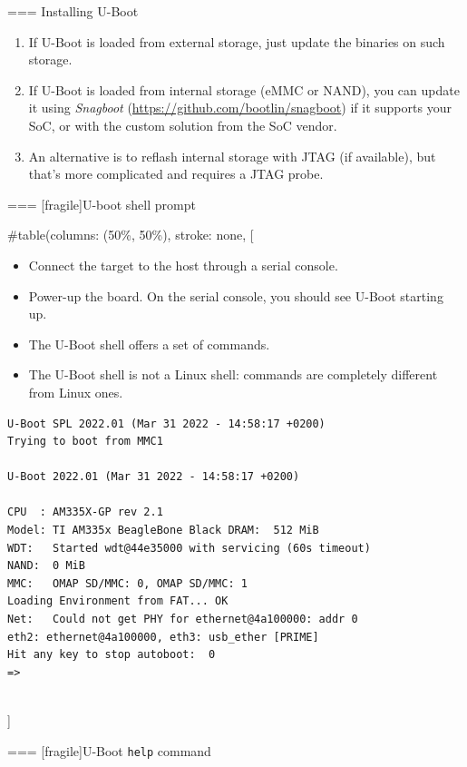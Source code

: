 === {Installing U-Boot}
  \begin{enumerate}
  \item If U-Boot is loaded from external storage, just update
        the binaries on such storage.
  \item If U-Boot is loaded from internal storage (eMMC or NAND),
        you can update it using {\em Snagboot}
        (\url{https://github.com/bootlin/snagboot}) if it supports
        your SoC, or with the custom solution from the SoC vendor.
  \item An alternative is to reflash internal storage with JTAG
        (if available), but that's more complicated and requires
        a JTAG probe.
  \end{enumerate}


=== [fragile]{U-boot shell prompt}
  
#table(columns: (50\%, 50\%), stroke: none,
[
    \begin{itemize}
    \item Connect the target to the host through a serial console.
    \item Power-up the board. On the serial console, you should
      see U-Boot starting up.
    \item The U-Boot shell offers a set of commands.
    \item The U-Boot shell is not a Linux shell: commands are
      completely different from Linux ones.
    \end{itemize}
    \begin{block}{}
      {\tiny
\begin{verbatim}
U-Boot SPL 2022.01 (Mar 31 2022 - 14:58:17 +0200)
Trying to boot from MMC1

U-Boot 2022.01 (Mar 31 2022 - 14:58:17 +0200)

CPU  : AM335X-GP rev 2.1
Model: TI AM335x BeagleBone Black DRAM:  512 MiB
WDT:   Started wdt@44e35000 with servicing (60s timeout)
NAND:  0 MiB
MMC:   OMAP SD/MMC: 0, OMAP SD/MMC: 1
Loading Environment from FAT... OK
Net:   Could not get PHY for ethernet@4a100000: addr 0
eth2: ethernet@4a100000, eth3: usb_ether [PRIME]
Hit any key to stop autoboot:  0
=>
\end{verbatim}
      }
    \end{block}
  \\]


=== [fragile]{U-Boot {\tt help} command}
  
